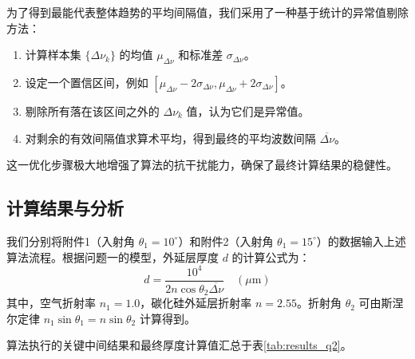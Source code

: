 \documentclass{ctexart} %
\begin{document}
为了得到最能代表整体趋势的平均间隔值，我们采用了一种基于统计的异常值剔除方法：
\begin{enumerate}
    \item 计算样本集 $\{\Delta\nu_k\}$ 的均值 $\mu_{\Delta\nu}$ 和标准差 $\sigma_{\Delta\nu}$。
    \item 设定一个置信区间，例如 $[\mu_{\Delta\nu} - 2\sigma_{\Delta\nu}, \mu_{\Delta\nu} + 2\sigma_{\Delta\nu}]$。
    \item 剔除所有落在该区间之外的 $\Delta\nu_k$ 值，认为它们是异常值。
    \item 对剩余的有效间隔值求算术平均，得到最终的平均波数间隔 $\overline{\Delta\nu}$。
\end{enumerate}
这一优化步骤极大地增强了算法的抗干扰能力，确保了最终计算结果的稳健性。

\subsection{计算结果与分析}
我们分别将附件1（入射角 $\theta_1 = 10^\circ$）和附件2（入射角 $\theta_1 = 15^\circ$）的数据输入上述算法流程。根据问题一的模型，外延层厚度 $d$ 的计算公式为：
\begin{equation}
    d = \frac{10^4}{2 n \cos\theta_2 \overline{\Delta\nu}} \quad (\mu\text{m})
\end{equation}
其中，空气折射率 $n_1=1.0$，碳化硅外延层折射率 $n=2.55$。折射角 $\theta_2$ 可由斯涅尔定律 $n_1 \sin\theta_1 = n \sin\theta_2$ 计算得到。

算法执行的关键中间结果和最终厚度计算值汇总于表\ref{tab:results_q2}。
\end{document}
